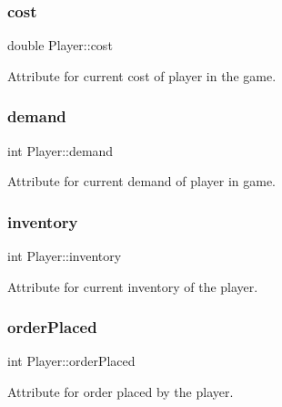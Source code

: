 \subsubsection{\texorpdfstring{cost}{cost}}
{\footnotesize\ttfamily double Player\+::cost\hspace{0.3cm}{\ttfamily [private]}}



Attribute for current cost of player in the game. 

\mbox{\label{class_player_aec98bfa93606a2b7cf4978c7d500917b}} 
\subsubsection{\texorpdfstring{demand}{demand}}
{\footnotesize\ttfamily int Player\+::demand\hspace{0.3cm}{\ttfamily [private]}}



Attribute for current demand of player in game. 

\mbox{\label{class_player_a68e4cf30506015d9291ffc4c1c5b1078}} 
\subsubsection{\texorpdfstring{inventory}{inventory}}
{\footnotesize\ttfamily int Player\+::inventory\hspace{0.3cm}{\ttfamily [private]}}



Attribute for current inventory of the player. 

\mbox{\label{class_player_a5ce498c11486dc2994a9ab7f3ba24260}} 
\subsubsection{\texorpdfstring{order\+Placed}{orderPlaced}}
{\footnotesize\ttfamily int Player\+::order\+Placed\hspace{0.3cm}{\ttfamily [private]}}



Attribute for order placed by the player. 

